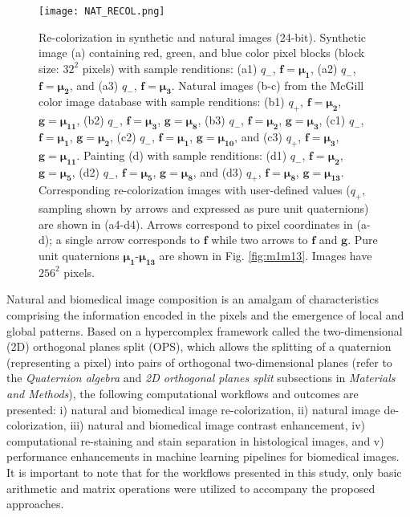 \documentclass[superscriptaddress,longbibliography,aps,prl,twocolumn,10pt]{revtex4-2}
\begin{document}
\begin{figure}[b]
\centering
\texttt{[image: NAT\_RECOL.png]}
\vspace{-12pt}
\caption{\footnotesize{Re-colorization in synthetic and natural images (24-bit). Synthetic image (a) containing red, green, and blue color pixel blocks (block size: $32^2$ pixels) with sample renditions: (a1) $q_-$, $\boldsymbol{f} = \boldsymbol{\mu_{1}}$, (a2) $q_-$, $\boldsymbol{f} = \boldsymbol{\mu_{2}}$, and (a3) $q_-$, $\boldsymbol{f} = \boldsymbol{\mu_{3}}$. Natural images (b-c) from the McGill color image database \cite{Olmos2004} with sample renditions: (b1) $q_+$, $\boldsymbol{f} = \boldsymbol{\mu_{2}}$, $\boldsymbol{g} = \boldsymbol{\mu_{11}}$, (b2) $q_-$, $\boldsymbol{f} = \boldsymbol{\mu_{3}}$, $\boldsymbol{g} = \boldsymbol{\mu_{8}}$, (b3) $q_-$, $\boldsymbol{f} = \boldsymbol{\mu_{2}}$, $\boldsymbol{g} = \boldsymbol{\mu_{3}}$, (c1) $q_-$, $\boldsymbol{f} = \boldsymbol{\mu_{1}}$, $\boldsymbol{g} = \boldsymbol{\mu_{2}}$, (c2) $q_-$, $\boldsymbol{f} = \boldsymbol{\mu_{1}}$, $\boldsymbol{g} = \boldsymbol{\mu_{10}}$, and (c3) $q_+$, $\boldsymbol{f} = \boldsymbol{\mu_{3}}$, $\boldsymbol{g} = \boldsymbol{\mu_{11}}$. Painting (d) with sample renditions: (d1) $q_-$, $\boldsymbol{f} = \boldsymbol{\mu_{2}}$, $\boldsymbol{g} = \boldsymbol{\mu_{5}}$, (d2) $q_-$, $\boldsymbol{f} = \boldsymbol{\mu_{5}}$, $\boldsymbol{g} = \boldsymbol{\mu_{8}}$, and (d3) $q_+$, $\boldsymbol{f} = \boldsymbol{\mu_{8}}$, $\boldsymbol{g} = \boldsymbol{\mu_{13}}$. Corresponding re-colorization images with user-defined values ($q_+$, sampling shown by arrows and expressed as pure unit quaternions) are shown in (a4-d4). Arrows correspond to pixel coordinates in (a-d); a single arrow corresponds to $\boldsymbol{f}$ while two arrows to $\boldsymbol{f}$ and $\boldsymbol{g}$. Pure unit quaternions $\boldsymbol{\mu_{1}}$-$\boldsymbol{\mu_{13}}$ are shown in Fig. \ref{fig:m1m13}. Images have $256^2$ pixels.}}
\label{fig:img_recol}
\end{figure}

Natural and biomedical image composition is an amalgam of characteristics comprising the information encoded in the pixels and the emergence of local and global patterns. Based on a hypercomplex framework called the two-dimensional (2D) orthogonal planes split (OPS), which allows the splitting of a quaternion (representing a pixel) into pairs of orthogonal two-dimensional planes \cite{HitzerSangwine2013, Hitzer2015} (refer to the \textit{Quaternion algebra} and \textit{2D orthogonal planes split} subsections in \textit{Materials and Methods}), the following computational workflows and outcomes are presented: i) natural and biomedical image re-colorization, ii) natural image de-colorization, iii) natural and biomedical image contrast enhancement, iv) computational re-staining and stain separation in histological images, and v) performance enhancements in machine learning pipelines for biomedical images. It is important to note that for the workflows presented in this study, only basic arithmetic and matrix operations were utilized to accompany the proposed approaches. 
\end{document}

